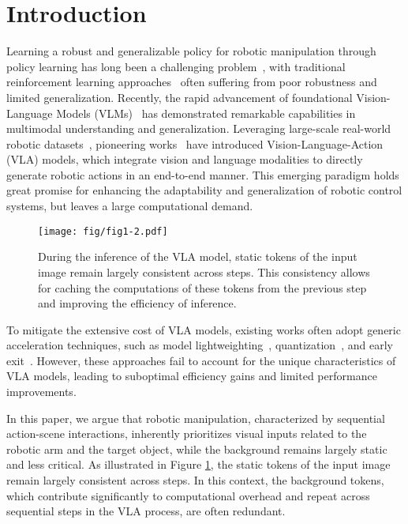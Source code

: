 \section{Introduction}

Learning a robust and generalizable policy for robotic manipulation through policy learning has long been a challenging problem~\cite{kim2020domain}, with traditional reinforcement learning approaches~\cite{choi2024domain,bica2021invariant} often suffering from poor robustness and limited generalization. Recently, the rapid advancement of foundational Vision-Language Models (VLMs)~\cite{awadalla2023openflamingo,liu2024visual} has demonstrated remarkable capabilities in multimodal understanding and generalization. Leveraging large-scale real-world robotic datasets~\cite{o2024open,fang2024rh20t}, pioneering works~\cite{zitkovich2023rt,octo_2023,niu2024llarva,kim24openvla} have introduced Vision-Language-Action (VLA) models, which integrate vision and language modalities to directly generate robotic actions in an end-to-end manner. This emerging paradigm holds great promise for enhancing the adaptability and generalization of robotic control systems, but leaves a large computational demand.

\begin{figure}[!tbp]
    \centering
    \texttt{[image: fig/fig1-2.pdf]}
    \vskip -0.07in
    \caption{During the inference of the VLA model, static tokens of the input image remain largely consistent across steps. This consistency allows for caching the computations of these tokens from the previous step and improving the efficiency of inference.}
    \vskip -0.15in
    \label{fig:motivation}
\end{figure}

To mitigate the extensive cost of VLA models, existing works often adopt generic acceleration techniques, such as model lightweighting~\cite{wen2024tinyvla}, quantization~\cite{park2024quantization}, and early exit~\cite{DeeR-VLA}. However, these approaches fail to account for the unique characteristics of VLA models, leading to suboptimal efficiency gains and limited performance improvements.


In this paper, we argue that robotic manipulation, characterized by sequential action-scene interactions, inherently prioritizes visual inputs related to the robotic arm and the target object, while the background remains largely static and less critical. As illustrated in Figure \ref{fig:motivation}, the static tokens of the input image remain largely consistent across steps. In this context, the background tokens, which contribute significantly to computational overhead and repeat across sequential steps in the VLA process, are often redundant.

